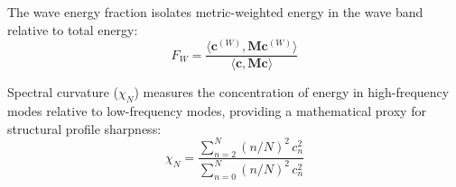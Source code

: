 The wave energy fraction isolates metric-weighted energy in the wave band relative to total energy:
\begin{equation}
F_W = \frac{\langle \mathbf{c}^{(W)}, \mathbf{M} \mathbf{c}^{(W)} \rangle}{\langle \mathbf{c}, \mathbf{M} \mathbf{c} \rangle}
\label{eq:f_w}
\end{equation}

Spectral curvature ($\chi_N$) measures the concentration of energy in high-frequency modes relative to low-frequency modes, providing a mathematical proxy for structural profile sharpness:
\begin{equation}
\chi_N = \frac{\sum_{n=2}^{N} (n/N)^2 \, c_n^2}{\sum_{n=0}^{N} (n/N)^2 \, c_n^2}
\label{eq:chi_n}
\end{equation}